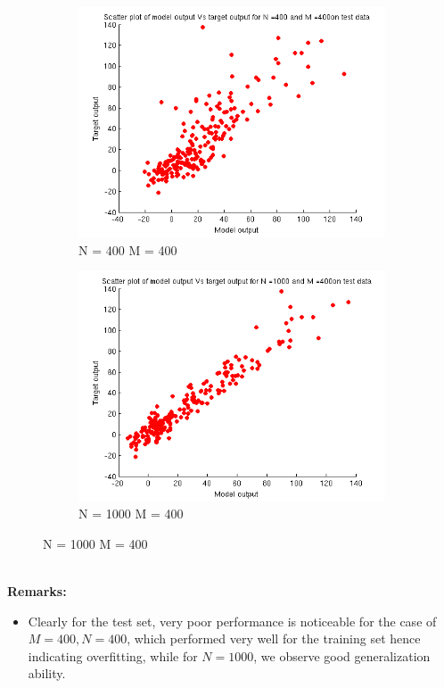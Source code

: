 \documentclass{article}
\begin{document}
\begin{figure}
\begin{subfigure}{.5\textwidth}
\centering
\includegraphics[width=\linewidth]{D2/Scatter/test_400_400}
\caption{N = 400 M = 400}
\end{subfigure}
\begin{subfigure}{.5\textwidth}
\includegraphics[width=\linewidth]{D2/Scatter/test_1000_400}
\caption{N = 1000 M = 400}
\end{subfigure}
\end{figure}
\textbf{\\[10pt]Remarks:}
\begin{itemize}
\item Clearly for the test set, very poor performance is noticeable for the case of $M=400, N=400$, which performed very well for the training set hence indicating overfitting, while for $N = 1000$, we observe good generalization ability.
\end{itemize}
\end{document}
